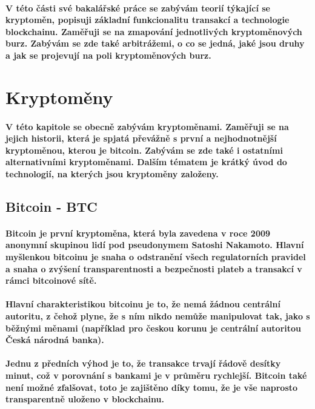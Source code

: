 \documentclass[thesis=B,czech]{FITthesis}[2019/03/21]
\begin{document}
\paragraph{
V této části své bakalářské práce se zabývám teorií týkající se kryptoměn, popisuji základní funkcionalitu transakcí a technologie blockchainu. Zaměřuji se na zmapování jednotlivých kryptoměnových burz. Zabývám se zde také arbitrážemi, o co se jedná, jaké jsou druhy a jak se projevují na poli kryptoměnových burz.
}
\section{Kryptoměny}
\paragraph{
V této kapitole se obecně zabývám kryptoměnami. Zaměřuji se na jejich historii, která je spjatá převážně s první a nejhodnotnější kryptoměnou, kterou je bitcoin. Zabývám se zde také i ostatními alternativními kryptoměnami. 
Dalším tématem je krátký úvod do technologií, na kterých jsou kryptoměny založeny. \cite{BudoucnostFinTrhu}
}
\subsection{Bitcoin - BTC}
\paragraph{
Bitcoin je první kryptoměna, která byla zavedena v roce 2009 anonymní skupinou lidí pod pseudonymem Satoshi Nakamoto. Hlavní myšlenkou bitcoinu je snaha o odstranění všech regulatorních pravidel a snaha o zvýšení transparentnosti a bezpečnosti plateb a transakcí v rámci bitcoinové sítě. \cite{Finex}
}
\paragraph{
Hlavní charakteristikou bitcoinu je to, že nemá žádnou centrální autoritu, z čehož plyne, že s ním nikdo nemůže manipulovat tak, jako s běžnými měnami (například pro českou korunu je centrální autoritou Česká národná banka).
}
\paragraph{
Jednu z předních výhod je to, že transakce trvají řádově desítky minut, což v porovnání s bankami je v průměru rychlejší. Bitcoin také není možné zfalšovat, toto je zajištěno díky tomu, že je vše naprosto transparentně uloženo v blockchainu.
}
\end{document}
